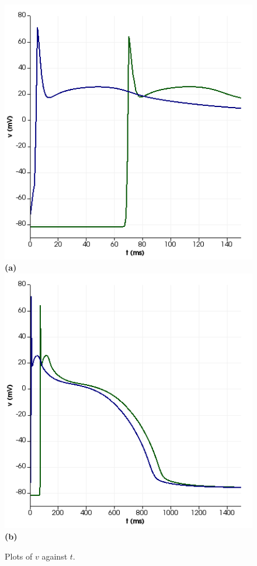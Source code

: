 \documentclass[12pt,a4paper]{article}
\begin{document}

\begin{figure}

 \includegraphics[width=0.7\linewidth]{v150}  \textbf{(a)}
   \includegraphics[width=0.7\linewidth]{v1500} \textbf{(b)}
    \caption{Plots of $v$ against $t$.}
    \label{fig:3}
\end{figure}
\end{document}
